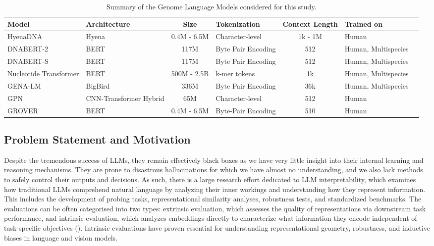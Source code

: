 \documentclass{ifacconf}
\begin{document}
\begin{table}[t!]
\caption{Summary of the Genome Language Models considered for this study.}
\label{models}
\vskip 0.05in
\begin{center}
\begin{small}
\begin{sc}
\begin{tabular}{m{4cm}m{2cm}cm{2cm}cm{2cm}c}
\toprule
Model & Architecture & Size & Tokenization & Context Length &  {Trained on}  \\
\midrule
HyenaDNA    & Hyena & 0.4M - 6.5M & Character-level & 1k - 1M & Human  \\
DNABERT-2 & BERT & 117M & Byte Pair Encoding & 512 & Human, Multispecies \\
DNABERT-S    & BERT & 117M & Byte Pair Encoding & 512 & Human, Multispecies \\
Nucleotide Transformer   & BERT & 500M - 2.5B & k-mer tokens & 1k & Human, Multispecies   \\
GENA-LM  & BigBird & 336M & Byte Pair Encoding & 36k & Human, Multispecies \\
GPN   & CNN-Transformer Hybrid &  65M & Character-level & 512 & Human   \\
GROVER  & BERT & 0.4M - 6.5M & Byte-Pair Encoding & 510 & Human   \\
\bottomrule
\end{tabular}
\end{sc}
\end{small}
\end{center}
\vskip 0.1in
\end{table}

\newpage
\subsection{Problem Statement and Motivation}

Despite the tremendous success of LLMs, they remain effectively black boxes as we have very little insight into their internal learning and reasoning mechanisms. They are prone to disastrous hallucinations for which we have almost no understanding, and we also lack methods to safely control their outputs and decisions. As such, there is a large research effort dedicated to LLM interpretability, which examines how traditional LLMs comprehend natural language by analyzing their inner workings and understanding how they
represent information. This includes the development of probing tasks, representational similarity analyses, robustness tests, and standardized benchmarks. The evaluations can be often categorised into two types: extrinsic evaluation, which assesses the quality of representations via downstream task performance, and intrinsic evaluation, which analyzes embeddings directly to characterize what information they encode independent of task-specific objectives (\cite{Marin2024}). Intrinsic evaluations have proven essential for understanding representational geometry, robustness, and inductive biases in language and vision models.
\end{document}
